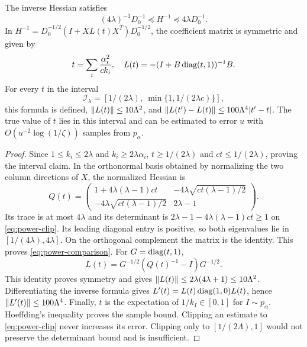 \begin{lemma}\label{lem:power-core}
The inverse Hessian satisfies
\begin{equation}\label{eq:power-comparison}
 (4\lambda)^{-1}D_0^{-1}\preceq H^{-1}\preceq4\lambda D_0^{-1}.
\end{equation}
In $H^{-1}=D_0^{-1/2}(I+XL(t)X^T)D_0^{-1/2}$, the coefficient
matrix is symmetric and given by
\[
 t=\sum_i\frac{\alpha_i^2}{c k_i},\quad
 L(t)=-(I+B\operatorname{diag}(t,1))^{-1}B.
\]
For every $t$ in the interval
\begin{equation}\label{eq:power-clip}
 \mathcal I_\lambda=
 [1/(2\lambda),\ \min\{1,1/(2\lambda c)\}],
\end{equation}
this formula is defined, $\left\lVert L(t)\right\rVert\leq10\Lambda^2$, and
$\left\lVert L(t')-L(t)\right\rVert\leq100\Lambda^4|t'-t|$.
The true value of $t$ lies in this interval and can be estimated to error
$u$ with $O(u^{-2}\log(1/\zeta))$ samples from $p_\alpha$.
\end{lemma}
\begin{proof}
Since $1\leq k_i\leq2\lambda$ and $k_i\geq2\lambda\alpha_i$,
$t\geq1/(2\lambda)$ and $ct\leq1/(2\lambda)$, proving the interval
claim. In the orthonormal basis obtained by normalizing the two column
directions of $X$, the normalized
Hessian is
\[
 Q(t)=\begin{pmatrix}
 1+4\lambda(\lambda-1)ct&-4\lambda\sqrt{ct(\lambda-1)/2}\\
 -4\lambda\sqrt{ct(\lambda-1)/2}&2\lambda-1
 \end{pmatrix}.
\]
Its trace is at most $4\lambda$ and its determinant is
$2\lambda-1-4\lambda(\lambda-1)ct\geq1$ on
\eqref{eq:power-clip}. Its leading diagonal entry is positive, so both
eigenvalues lie in $[1/(4\lambda),4\lambda]$. On the orthogonal
complement the matrix is the identity. This proves \eqref{eq:power-comparison}.
For $G=\operatorname{diag}(t,1)$,
\[
 L(t)=G^{-1/2}(Q(t)^{-1}-I)G^{-1/2}.
\]
This identity proves symmetry and gives
$\left\lVert L(t)\right\rVert\leq2\lambda(4\lambda+1)\leq10\Lambda^2$.
Differentiating the inverse formula gives
$L'(t)=L(t)\operatorname{diag}(1,0)L(t)$, hence
$\left\lVert L'(t)\right\rVert\leq100\Lambda^4$. Finally, $t$ is the expectation of
$1/k_I\in[0,1]$ for $I\sim p_\alpha$. Hoeffding's inequality proves the
sample bound. Clipping an estimate to \eqref{eq:power-clip} never increases
its error. Clipping only to $[1/(2\Lambda),1]$ would not preserve the
determinant bound and is insufficient.
\end{proof}

